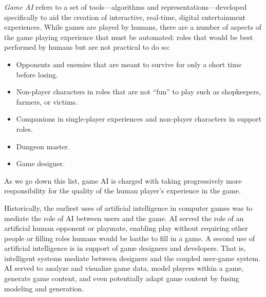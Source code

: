 \documentclass[conference]{IEEEtran}
\begin{document}
{\em Game AI} refers to a set of tools---algorithms and representations---developed specifically to aid the creation of interactive, real-time, digital entertainment experiences.
While games are played by humans, there are a number of aspects of the game playing experience that must be automated: roles that would be best performed by humans but are not practical to do so:

\begin{itemize}
\item Opponents and enemies that are meant to survive for only a short time before losing.
\item Non-player characters in roles that are not ``fun'' to play such as shopkeepers, farmers, or victims.
\item Companions in single-player experiences and non-player characters in support roles.
\item Dungeon master.
\item Game designer.
\end{itemize}

\noindent
As we go down this list, game AI is charged with taking progressively more responsibility for the quality of the human player's experience in the game.


Historically, the earliest uses of artificial intelligence in computer games was to mediate the role of AI between users and the game.
AI served the role of an artificial human opponent or playmate, enabling play without requiring other people or filling roles humans would be loathe to fill in a game.
%
A second use of artificial intelligence is in support of game designers and developers.
That is, intelligent systems mediate between designers and the coupled user-game system.
AI served to analyze and visualize game data, model players within a game, generate game content, and even potentially adapt game content by fusing modeling and generation.
\end{document}
